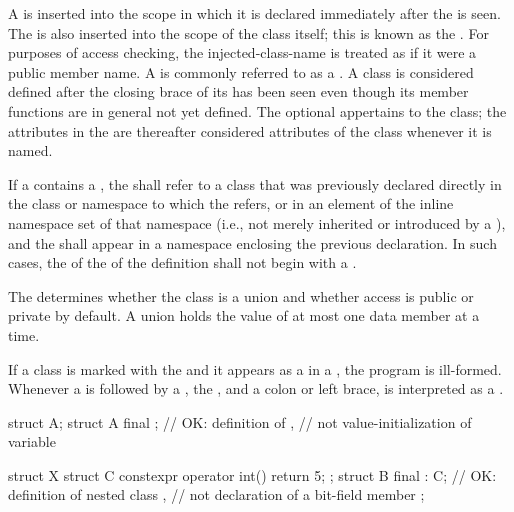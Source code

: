 \pnum
A  is inserted into the scope in which it is
declared immediately after the  is seen. The
 is also inserted into the scope of the class
itself; this is known as the .
For purposes of access checking, the injected-class-name is treated as
if it were a public member name.
A  is commonly referred to as a .
A class is considered defined after the closing brace of its
 has been seen even though its member
functions are in general not yet defined.
The optional  appertains to the class; the attributes in
the  are thereafter considered attributes of the class
whenever it is named.

\pnum
If a  contains a ,
the  shall refer to a class that was
previously declared directly in the class or namespace to which the
 refers,
or in an element of the inline namespace set of that namespace
(i.e., not merely inherited or
introduced by a ), and the
 shall appear in a namespace enclosing the
previous declaration.
In such cases, the  of the
 of the
definition shall not begin with a .

\pnum
\begin{note}
The  determines
whether the class is a union and
whether access is public or private by default.
A union holds the value of at most one data member at a time.
\end{note}

\pnum
If a class is marked with the   and it appears
as a  in a ,
the program is ill-formed. Whenever a
 is followed by a , the
 , and a colon or left brace,  is
interpreted as a .
\begin{example}
\begin{codeblock}
struct A;
struct A final {};      // OK: definition of ,
                        // not value-initialization of variable 

struct X {
 struct C { constexpr operator int() { return 5; } };
 struct B final : C{};  // OK: definition of nested class ,
                        // not declaration of a bit-field member 
};
\end{codeblock}
\end{example}

